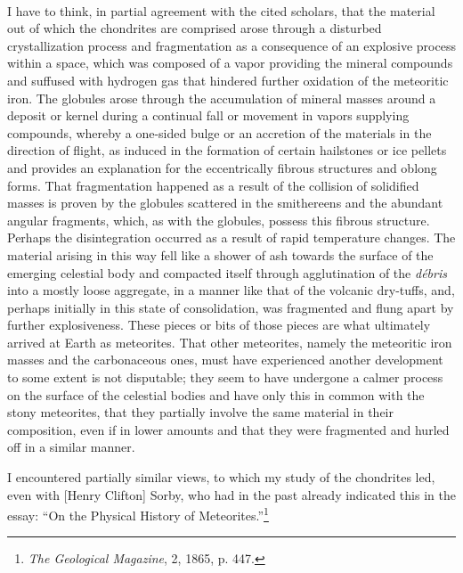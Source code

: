 \documentclass[a4paper, 12pt, oneside]{article}
\begin{document}
\paragraph*{}
I have to think, in partial agreement with the cited scholars, that the material out of which the chondrites are comprised arose through a disturbed crystallization process and fragmentation as a consequence of an explosive process within a space, which was composed of a vapor providing the mineral compounds and suffused with hydrogen gas that hindered further oxidation of the meteoritic iron. The globules arose through the accumulation of mineral masses around a deposit or kernel during a continual fall or movement in vapors supplying compounds, whereby a one-sided bulge or an accretion of the materials in the direction of flight, as induced in the formation of certain hailstones or ice pellets and provides an explanation for the eccentrically fibrous structures and oblong forms. That fragmentation happened as a result of the collision of solidified masses is proven by the globules scattered in the smithereens and the abundant angular fragments, which, as with the globules, possess this fibrous structure. Perhaps the disintegration occurred as a result of rapid temperature changes. The material arising in this way fell like a shower of ash towards the surface of the emerging celestial body and compacted itself through agglutination of the \emph{débris} into a mostly loose aggregate, in a manner like that of the volcanic dry-tuffs, and, perhaps initially in this state of consolidation, was fragmented and flung apart by further explosiveness. These pieces or bits of those pieces are what ultimately arrived at Earth as meteorites. That other meteorites, namely the meteoritic iron masses and the carbonaceous ones, must have experienced another development to some extent is not disputable; they seem to have undergone a calmer process on the surface of the celestial bodies and have only this in common with the stony meteorites, that they partially involve the same material in their composition, even if in lower amounts and that they were fragmented and hurled off in a similar manner.

I encountered partially similar views, to which my study of the chondrites led, even with [Henry Clifton] Sorby, who had in the past already indicated this in the essay: ``On the Physical History of Meteorites.''\footnote{\emph{The Geological Magazine}, 2, 1865, p. 447.}
\end{document}
